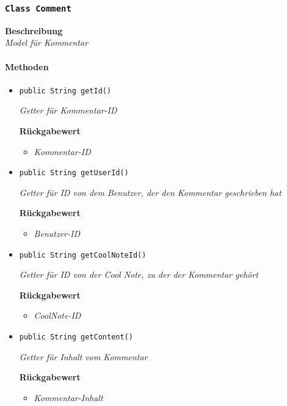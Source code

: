     \subsubsection{\texttt{Class Comment}}
     \textbf{Beschreibung} \\
     \textit{Model für Kommentar}
     \paragraph*{Methoden}
     \begin{itemize}
     	\item{\texttt{public String getId()}}
     	
     	\textit{Getter für Kommentar-ID}
     	
     	\textbf{Rückgabewert}
     	\begin{itemize}
     		\item\textit{Kommentar-ID}
     	\end{itemize}
     
     \item{\texttt{public String getUserId()}}
     	
     	\textit{Getter für ID von dem Benutzer, der den Kommentar geschrieben hat}
     	
     	\textbf{Rückgabewert}
     	\begin{itemize}
     		\item\textit{Benutzer-ID}
     	\end{itemize}
     
     \item{\texttt{public String getCoolNoteId()}}
     	
     	\textit{Getter für ID von der Cool Note, zu der der Kommentar gehört}
     	
     	\textbf{Rückgabewert}
     	\begin{itemize}
     		\item\textit{CoolNote-ID}
     	\end{itemize}
     
     \item{\texttt{public String getContent()}}
     	
     	\textit{Getter für Inhalt vom Kommentar}
     	
     	\textbf{Rückgabewert}
     	\begin{itemize}
     		\item\textit{Kommentar-Inhalt}
     	\end{itemize}
     

\end{itemize}
